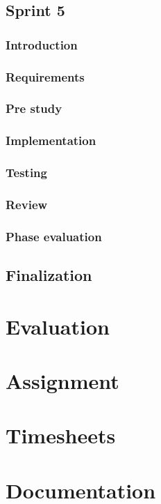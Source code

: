 \documentclass[11pt]{book}
\begin{document}
\section{Sprint 5}
\subsection{Introduction}
\subsection{Requirements}
\subsection{Pre study}
\subsection{Implementation}
\subsection{Testing}
\subsection{Review}
\subsection{Phase evaluation}

\section{Finalization}

\chapter{Evaluation}



\appendix
\chapter{Assignment}

\chapter{Timesheets}

\chapter{Documentation}
\end{document}
